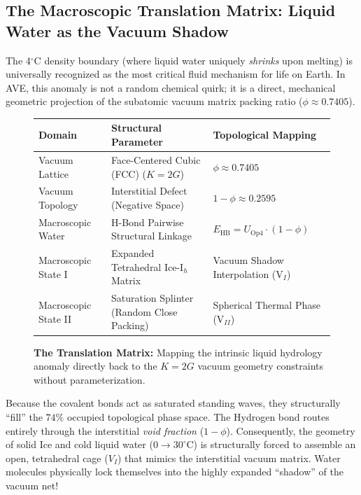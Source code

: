 \subsection{The Macroscopic Translation Matrix: Liquid Water as the Vacuum Shadow}
The 4$^\circ$C density boundary (where liquid water uniquely \emph{shrinks} upon melting) is universally recognized as the most critical fluid mechanism for life on Earth. In AVE, this anomaly is not a random chemical quirk; it is a direct, mechanical geometric projection of the subatomic vacuum matrix packing ratio ($\phi \approx 0.7405$).

\begin{figure}[h]
    \centering
    \begin{tabularx}{\textwidth}{@{}|l|l|X|@{}}
    \hline
    \textbf{Domain} & \textbf{Structural Parameter} & \textbf{Topological Mapping} \\ \hline
    \rowcolor{gray!10}
    Vacuum Lattice & Face-Centered Cubic (FCC) ($K=2G$) & $\phi \approx 0.7405$ \\ \hline
    Vacuum Topology & Interstitial Defect (Negative Space) & $1-\phi \approx 0.2595$ \\ \hline  
    \rowcolor{gray!10}
    Macroscopic Water & H-Bond Pairwise Structural Linkage & $E_\text{HB} = U_\text{Op4} \cdot (1-\phi)$ \\ \hline
    Macroscopic State I & Expanded Tetrahedral Ice-I$_h$ Matrix & Vacuum Shadow Interpolation (V$_I$) \\ \hline
    \rowcolor{gray!10}
    Macroscopic State II & Saturation Splinter (Random Close Packing) & Spherical Thermal Phase (V$_{II}$) \\ \hline
    \end{tabularx}
    \caption{\textbf{The Translation Matrix:} Mapping the intrinsic liquid hydrology anomaly directly back to the $K=2G$ vacuum geometry constraints without parameterization.}
    \label{tab:translation_matrix}
\end{figure}

Because the covalent bonds act as saturated standing waves, they structurally ``fill'' the $74\%$ occupied topological phase space. The Hydrogen bond routes entirely through the interstitial \emph{void fraction} ($1-\phi$). Consequently, the geometry of solid Ice and cold liquid water ($0 \to 30^\circ$C) is structurally forced to assemble an open, tetrahedral cage ($V_I$) that mimics the interstitial vacuum matrix. Water molecules physically lock themselves into the highly expanded ``shadow'' of the vacuum net!

